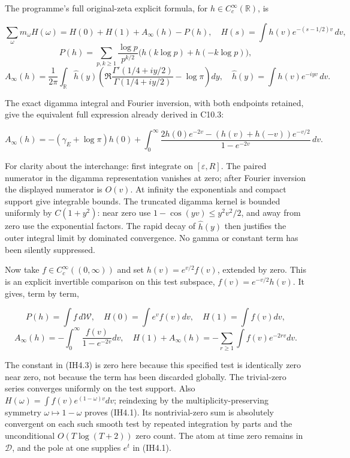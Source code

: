 The programme's full original-zeta explicit formula, for
\(h\in C_c^\infty(\mathbb R)\), is

\[
\sum_\omega m_\omega H(\omega)=H(0)+H(1)+A_\infty(h)-P(h),
\quad H(s)=\int h(v)e^{-(s-1/2)v}\,dv,
\] \[
P(h)=\sum_{p,k\ge1}\frac{\log p}{p^{k/2}}
\bigl(h(k\log p)+h(-k\log p)\bigr),
\] \[
A_\infty(h)=\frac1{2\pi}\int_{\mathbb R}\widehat h(y)
\left(\Re\frac{\Gamma'(1/4+iy/2)}{\Gamma(1/4+iy/2)}-\log\pi\right)dy,
\quad \widehat h(y)=\int h(v)e^{-iyv}\,dv.
\tag{IH4.2}
\]

The exact digamma integral and Fourier inversion, with both endpoints
retained, give the equivalent full expression already derived in C10.3:

\[
A_\infty(h)=-(\gamma_E+\log\pi)h(0)
+\int_0^\infty\frac{2h(0)e^{-2v}-(h(v)+h(-v))e^{-v/2}}{1-e^{-2v}}\,dv.
\tag{IH4.3}
\]

For clarity about the interchange: first integrate on
\([\varepsilon,R]\). The paired numerator in the digamma representation
vanishes at zero; after Fourier inversion the displayed numerator is
\(O(v)\). At infinity the exponentials and compact support give
integrable bounds. The truncated digamma kernel is bounded uniformly by
\(C(1+y^2)\): near zero use \(1-\cos(yv)\le y^2v^2/2\), and away from
zero use the exponential factors. The rapid decay of \(\widehat h(y)\)
then justifies the outer integral limit by dominated convergence. No
gamma or constant term has been silently suppressed.

Now take \(f\in C_c^\infty((0,\infty))\) and set \(h(v)=e^{v/2}f(v)\),
extended by zero. This is an explicit invertible comparison on this test
subspace, \(f(v)=e^{-v/2}h(v)\). It gives, term by term,

\[
P(h)=\int f\,d\mathcal W,\quad H(0)=\int e^v f(v)dv,
\quad H(1)=\int f(v)dv,
\] \[
A_\infty(h)=-\int_0^\infty\frac{f(v)}{1-e^{-2v}}dv,
\quad
H(1)+A_\infty(h)=-\sum_{r\ge1}\int f(v)e^{-2rv}dv.
\tag{IH4.4}
\]

The constant in (IH4.3) is zero here because this specified test is
identically zero near zero, not because the term has been discarded
globally. The trivial-zero series converges uniformly on the test
support. Also \(H(\omega)=\int f(v)e^{(1-\omega)v}dv\); reindexing by
the multiplicity-preserving symmetry \(\omega\mapsto1-\omega\) proves
(IH4.1). Its nontrivial-zero sum is absolutely convergent on each such
smooth test by repeated integration by parts and the unconditional
\(O(T\log(T+2))\) zero count. The atom at time zero remains in
\(\mathcal D\), and the pole at one supplies \(e^t\) in (IH4.1).

